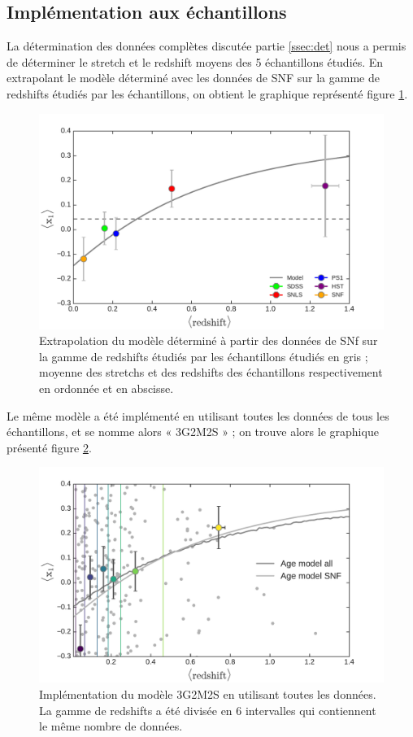 \documentclass[a4paper, 12pt, svgnames]{article}
\begin{document}
\subsection{Implémentation aux échantillons}\label{ssec:model}
La détermination des données complètes discutée partie \ref{ssec:det} nous a
permis de déterminer le stretch et le redshift moyens des 5 échantillons
étudiés. En extrapolant le modèle déterminé avec les données de SNF sur la gamme
de redshifts étudiés par les échantillons, on obtient le graphique représenté
figure \ref{fig:model_snf}.

\begin{figure}[htbp!]
    \centering
    \includegraphics[width=.5\linewidth]{Rapport_figures/model_snf.pdf}
    \captionsetup{justification=centering}
    \caption{Extrapolation du modèle déterminé à partir des données de SNf sur
    la gamme de redshifts étudiés par les échantillons étudiés en gris ; moyenne
des stretchs et des redshifts des échantillons respectivement en ordonnée et en
abscisse.}
    \label{fig:model_snf}
\end{figure}

Le même modèle a été implémenté en utilisant toutes les données de tous les
échantillons, et se nomme alors « 3G2M2S » ; on trouve alors le graphique
présenté figure \ref{fig:3G2M2S}.

\begin{figure}[htbp!]
    \centering
    \includegraphics[width=.5\linewidth]{Rapport_figures/model_all.pdf}
    \captionsetup{justification=centering}
    \caption{Implémentation du modèle 3G2M2S en utilisant toutes les données.
    La gamme de redshifts a été divisée en 6 intervalles qui contiennent le même
nombre de données.}
    \label{fig:3G2M2S}
\end{figure}
\end{document}
